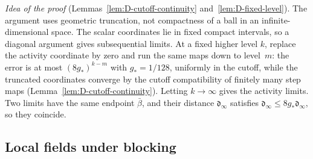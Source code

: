 \emph{Idea of the proof} (Lemmas~\ref{lem:D-cutoff-continuity} and~\ref{lem:D-fixed-level}). The argument uses geometric truncation, not compactness of a ball in an infinite-dimensional space. The scalar coordinates lie in fixed compact intervals, so a diagonal argument gives subsequential limits. At a fixed higher level $k$, replace the activity coordinate by zero and run the same maps down to level~$m$: the error is at most $(8g_*)^{k-m}$ with $g_*=1/128$, uniformly in the cutoff, while the truncated coordinates converge by the cutoff compatibility of finitely many step maps (Lemma~\ref{lem:D-cutoff-continuity}). Letting $k\to\infty$ gives the activity limits. Two limits have the same endpoint $\bar\beta$, and their distance $\mathfrak d_\infty$ satisfies $\mathfrak d_\infty\le8g_*\mathfrak d_\infty$, so they coincide.

\subsection{Local fields under blocking}\label{sec:marked}


